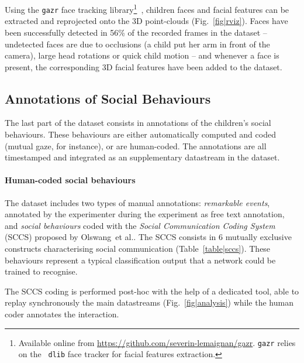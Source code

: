 \documentclass{article}
\newcommand{\etal}{et al.\xspace}
\begin{document}
Using the {\tt gazr} face tracking library\footnote{Available online from
\url{https://github.com/severin-lemaignan/gazr}. {\tt gazr} relies on the {\tt
dlib} face tracker for facial features
extraction.}~\cite{lemaignan2016realtime}, children faces and facial features
can be extracted and reprojected onto the 3D point-clouds
(Fig.~\ref{fig|rviz}). Faces have been successfully detected in 56\% of the
recorded frames in the dataset -- undetected faces are due to occlusions (a child
put her arm in front of the camera), large head rotations or quick child
motion -- and whenever a face is present, the corresponding 3D facial features
have been added to the dataset.

\subsection{Annotations of Social Behaviours}

The last part of the dataset consists in annotations of the children's social
behaviours. These behaviours are either automatically computed and coded
(mutual gaze, for instance), or are human-coded. The annotations are all
timestamped and integrated as an supplementary datastream in the dataset.

\paragraph{Human-coded social behaviours}

The dataset includes two types of manual annotations: \emph{remarkable events},
annotated by the experimenter during the experiment as free text annotation, and
\emph{social behaviours} coded with the \emph{Social Communication Coding
System} (SCCS) proposed by Olswang~\etal\cite{olswang2006reliability}.
The SCCS consists in 6 mutually exclusive constructs characterising social
communication (Table~\ref{table|sccs}). These behaviours represent a typical
classification output that a network could be trained to recognise.

The SCCS coding is performed post-hoc with the help of a dedicated tool, able
to replay synchronously the main datastreams (Fig.~\ref{fig|analysis}) while
the human coder annotates the interaction.
\end{document}
